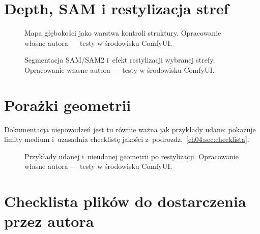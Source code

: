 \section{Depth, SAM i restylizacja stref}
\label{app:g:sec:structure}

\begin{figure}[htbp]
  \centering
  \caption{Mapa głębokości jako warstwa kontroli struktury.
  Opracowanie własne autora --- testy w środowisku ComfyUI.}
  \label{app:g:fig:depth}
\end{figure}

\begin{figure}[htbp]
  \centering
  \caption{Segmentacja SAM/SAM2 i~efekt restylizacji wybranej strefy.
  Opracowanie własne autora --- testy w środowisku ComfyUI.}
  \label{app:g:fig:sam}
\end{figure}

\section{Porażki geometrii}
\label{app:g:sec:failures}

Dokumentacja niepowodzeń jest tu równie ważna jak przykłady udane: pokazuje limity medium i~uzasadnia checklistę jakości z~podrozdz.~\ref{ch04:sec:checklista}.

\begin{figure}[htbp]
  \centering
  \caption{Przykłady udanej i~nieudanej geometrii po restylizacji.
  Opracowanie własne autora --- testy w środowisku ComfyUI.}
  \label{app:g:fig:geometry}
\end{figure}

\section{Checklista plików do dostarczenia przez autora}
\label{app:g:sec:checklist-files}

